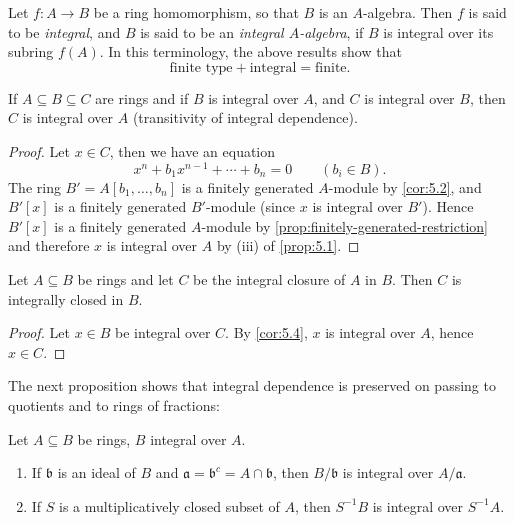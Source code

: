 \begin{remark}
    Let $f \colon A \to B$ be a ring homomorphism, so that $B$ is an $A$-algebra. Then $f$ is said to be \emph{integral}, and $B$ is said to be an \emph{integral $A$-algebra}, if $B$ is integral over its subring $f(A)$. In this terminology, the above results show that
    \[
    \text{finite type} + \text{integral} = \text{finite}.
    \]
\end{remark}

\begin{corollary}\label{cor:5.4}
    If $A \subseteq B \subseteq C$ are rings and if $B$ is integral over $A$, and $C$ is integral over $B$, then $C$ is integral over $A$ (transitivity of integral dependence).
\end{corollary}

\begin{proof}
    Let $x \in C$, then we have an equation
    \[
    x^n + b_1 x^{n-1} + \cdots + b_n = 0 \qquad (b_i \in B).
    \]
    The ring $B' = A[b_1, \ldots, b_n]$ is a finitely generated $A$-module by \eqref{cor:5.2}, and $B'[x]$ is a finitely generated $B'$-module (since $x$ is integral over $B'$). Hence $B'[x]$ is a finitely generated $A$-module by \eqref{prop:finitely-generated-restriction} and therefore $x$ is integral over $A$ by (iii) of \eqref{prop:5.1}.
\end{proof}

\begin{corollary}\label{cor:5.5}
Let $A \subseteq B$ be rings and let $C$ be the integral closure of $A$ in $B$. Then $C$ is integrally closed in $B$.
\end{corollary}

\begin{proof}
    Let $x \in B$ be integral over $C$. By \eqref{cor:5.4}, $x$ is integral over $A$, hence $x \in C$.
\end{proof}

The next proposition shows that integral dependence is preserved on passing to quotients and to rings of fractions:

\begin{proposition}\label{prop:5.6}
Let $A \subseteq B$ be rings, $B$ integral over $A$.
\begin{enumerate}
    \item[i)] \label{item 1:prop:5.6} If $\mathfrak{b}$ is an ideal of $B$ and $\mathfrak{a} = \mathfrak{b}^c = A \cap \mathfrak{b}$, then $B/\mathfrak{b}$ is integral over $A/\mathfrak{a}$.
    \item[ii)] \label{item 2:prop:5.6} If $S$ is a multiplicatively closed subset of $A$, then $S^{-1}B$ is integral over $S^{-1}A$.
\end{enumerate}
\end{proposition}

